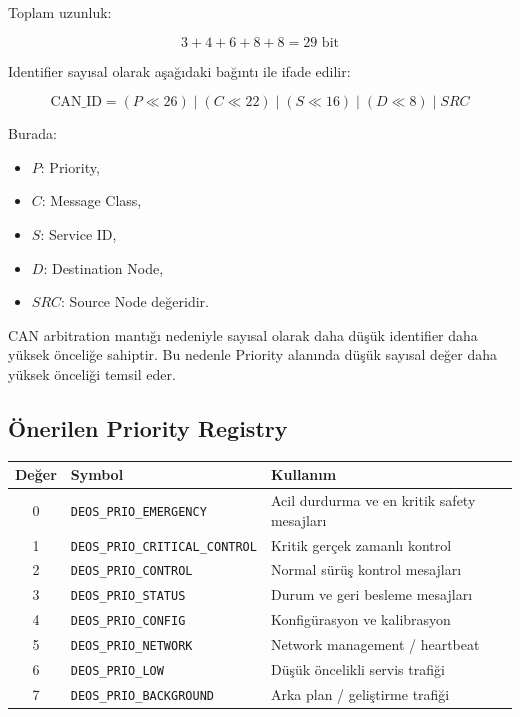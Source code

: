 \documentclass[a4paper,10pt]{article}
\newcommand{\code}[1]{\texttt{#1}}
\begin{document}
Toplam uzunluk:

\[
3 + 4 + 6 + 8 + 8 = 29 \text{ bit}
\]

Identifier sayısal olarak aşağıdaki bağıntı ile ifade edilir:

\[
\text{CAN\_ID} =
(P \ll 26)
\;|\;
(C \ll 22)
\;|\;
(S \ll 16)
\;|\;
(D \ll 8)
\;|\;
SRC
\]

Burada:
\begin{itemize}
    \item \(P\): Priority,
    \item \(C\): Message Class,
    \item \(S\): Service ID,
    \item \(D\): Destination Node,
    \item \(SRC\): Source Node değeridir.
\end{itemize}

CAN arbitration mantığı nedeniyle sayısal olarak daha düşük identifier daha yüksek
önceliğe sahiptir. Bu nedenle Priority alanında düşük sayısal değer daha yüksek önceliği
temsil eder.

\subsection{Önerilen Priority Registry}

\begin{center}
\begin{tabularx}{\textwidth}{c l X}
\toprule
Değer & Symbol & Kullanım \\
\midrule
0 & \code{DEOS\_PRIO\_EMERGENCY} & Acil durdurma ve en kritik safety mesajları \\
1 & \code{DEOS\_PRIO\_CRITICAL\_CONTROL} & Kritik gerçek zamanlı kontrol \\
2 & \code{DEOS\_PRIO\_CONTROL} & Normal sürüş kontrol mesajları \\
3 & \code{DEOS\_PRIO\_STATUS} & Durum ve geri besleme mesajları \\
4 & \code{DEOS\_PRIO\_CONFIG} & Konfigürasyon ve kalibrasyon \\
5 & \code{DEOS\_PRIO\_NETWORK} & Network management / heartbeat \\
6 & \code{DEOS\_PRIO\_LOW} & Düşük öncelikli servis trafiği \\
7 & \code{DEOS\_PRIO\_BACKGROUND} & Arka plan / geliştirme trafiği \\
\bottomrule
\end{tabularx}
\end{center}
\end{document}
